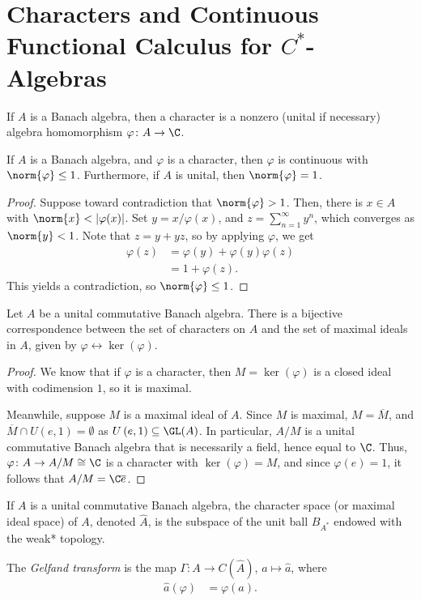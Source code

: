 \documentclass[10pt]{mypackage}
\begin{document}
\section{Characters and Continuous Functional Calculus for $C^{\ast}$-Algebras}%
\begin{definition}
  If $A$ is a Banach algebra, then a character is a nonzero (unital if necessary) algebra homomorphism $\varphi\colon A\rightarrow \C$.
\end{definition}
\begin{proposition}
  If $A$ is a Banach algebra, and $\varphi$ is a character, then $\varphi$ is continuous with $\norm{\varphi} \leq 1$. Furthermore, if $A$ is unital, then $\norm{\varphi} = 1$.
\end{proposition}
\begin{proof}
  Suppose toward contradiction that $\norm{\varphi} > 1$. Then, there is $x\in A$ with $\norm{x} < \left\vert \varphi(x) \right\vert$. Set $y = x/\varphi(x)$, and $z = \sum_{n=1}^{\infty}y^n$, which converges as $\norm{y} < 1$. Note that $z = y + yz$, so by applying $\varphi$, we get
  \begin{align*}
    \varphi(z) &= \varphi(y) + \varphi(y)\varphi(z)\\
               &= 1 + \varphi(z).
  \end{align*}
  This yields a contradiction, so $\norm{\varphi}\leq 1$.
\end{proof}
\begin{theorem}
  Let $A$ be a unital commutative Banach algebra. There is a bijective correspondence between the set of characters on $A$ and the set of maximal ideals in $A$, given by $\varphi\leftrightarrow \ker\left( \varphi \right)$.
\end{theorem}
\begin{proof}
  We know that if $\varphi$ is a character, then $M = \ker\left( \varphi \right)$ is a closed ideal with codimension $1$, so it is maximal.

  Meanwhile, suppose $M$ is a maximal ideal of $A$. Since $M$ is maximal, $M = \overline{M}$, and $ \overline{M}\cap U\left( e,1 \right) = \emptyset $ as $U\left( e,1 \right)\subseteq \GL(A)$. In particular, $A/M$ is a unital commutative Banach algebra that is necessarily a field, hence equal to $\C$. Thus, $\varphi\colon A\rightarrow A/M\cong \C$ is a character with $\ker\left( \varphi \right) = M$, and since $\varphi(e) = 1$, it follows that $A/M = \C \overline{e}$.
\end{proof}
\begin{definition}
  If $A$ is a unital commutative Banach algebra, the character space (or maximal ideal space) of $A$, denoted $\hat{A}$, is the subspace of the unit ball $B_{A^{\ast}}$ endowed with the weak* topology.

  The \textit{Gelfand transform} is the map $\Gamma\colon A\rightarrow C(\hat{A})$, $a\mapsto \hat{a}$, where
  \begin{align*}
    \hat{a}(\varphi) &= \varphi(a).
  \end{align*}
\end{definition}
\end{document}
